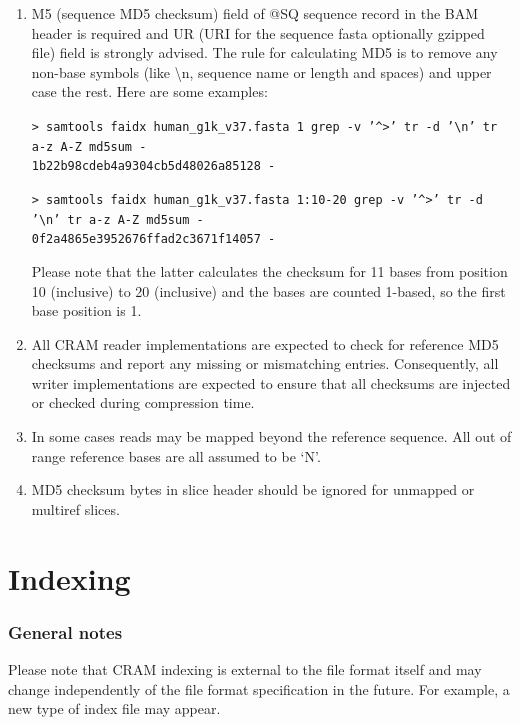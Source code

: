 \documentclass[a4paper]{article}
\begin{document}
\begin{enumerate}
\item M5 (sequence MD5 checksum) field of @SQ sequence record in the BAM header is 
required and UR (URI for the sequence fasta optionally gzipped file) field is strongly 
advised. The rule for calculating MD5 is to remove any non-base symbols (like \textbackslash{}n, 
sequence name or length and spaces) and upper case the rest. Here are some examples: 

\texttt{> samtools faidx human\_g1k\_v37.fasta 1 \textbar{} grep -v '\textasciicircum{}>' \textbar{} tr -d '\textbackslash{}n' \textbar{} tr a-z A-Z \textbar{} md5sum -\\
1b22b98cdeb4a9304cb5d48026a85128  -}

\texttt{> samtools faidx human\_g1k\_v37.fasta 1:10-20 \textbar{}grep -v '\textasciicircum{}\texttt{>}' \textbar{}tr -d '\textbackslash{}n' \textbar{}tr a-z A-Z \textbar{}md5sum -\\
0f2a4865e3952676ffad2c3671f14057  -}

Please note that the latter calculates the checksum for 11 bases from position 
10 (inclusive) to 20 (inclusive) and the bases are counted 1-based, so the first 
base position is 1. 

\item All CRAM reader implementations are expected to check for reference MD5 checksums 
and report any missing or mismatching entries. Consequently, all writer implementations 
are expected to ensure that all checksums are injected or checked during compression 
time. 

\item In some cases reads may be mapped beyond the reference sequence. All out of 
range reference bases are all assumed to be `N'. 

\item MD5 checksum bytes in slice header should be ignored for unmapped or multiref 
slices. 
\end{enumerate}

\section{\textbf{Indexing}}

\subsubsection*{General notes}

Please note that CRAM indexing is external to the file format itself and may change 
independently of the file format specification in the future. For example, a new 
type of index file may appear.
\end{document}
